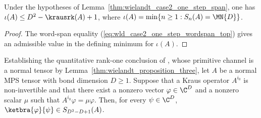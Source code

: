 \begin{corollary}%
    \label{cor:wielandt_case2_one_step_index}
    \leanok
    Under the hypotheses of Lemma~\ref{thm:wielandt_case2_one_step_span},
    one has $\iota(A)\le D^2-\krausrk(A)+1$, where
    $\iota(A)=\min\{n\ge1:S_n(A)=\MN{D}\}$.
\end{corollary}

\begin{proof}
    \leanok
    The word-span equality (\ref{eq:wld_case2_one_step_wordspan_top}) gives an
    admissible value in the defining minimum for $\iota(A)$.
\end{proof}

\begin{lemma}%
    \label{lem:rank_one_noninvertible_eigenvector}
    \leanok
    Establishing the quantitative rank-one conclusion of
    \cite[Lemma~2(b)]{Sanz2010Quantum}, whose primitive channel is a normal
    tensor by Lemma~\ref{thm:wielandt_proposition_three}, let $A$ be a normal
    MPS tensor with bond dimension $D\ge1$.
    Suppose that a Kraus operator $A^{i_0}$ is non-invertible and that
    there exist a nonzero vector $\varphi\in\C^D$ and a nonzero scalar $\mu$
    such that $A^{i_0}\varphi=\mu\varphi$.
    Then, for every $\psi\in\C^D$,
    $\ketbra{\varphi}{\psi}\in S_{D^2-D+1}(A)$.
\end{lemma}

